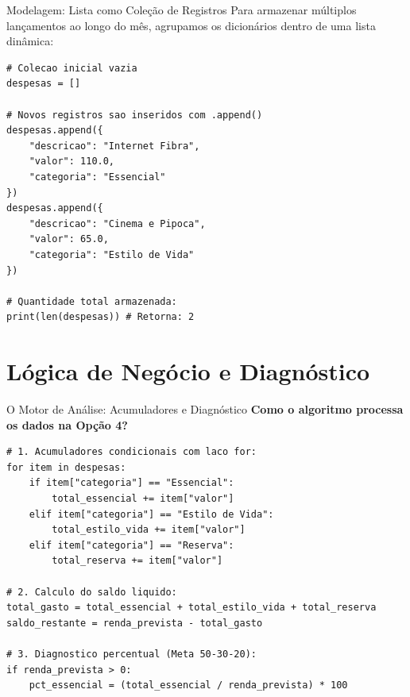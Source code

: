 \documentclass[10pt]{beamer}
\begin{document}
\begin{frame}[fragile]{Modelagem: Lista como Coleção de Registros}
    Para armazenar múltiplos lançamentos ao longo do mês, agrupamos os dicionários dentro de uma lista dinâmica:

    \vspace{0.2cm}
    \begin{lstlisting}
# Colecao inicial vazia
despesas = []

# Novos registros sao inseridos com .append()
despesas.append({
    "descricao": "Internet Fibra",
    "valor": 110.0,
    "categoria": "Essencial"
})
despesas.append({
    "descricao": "Cinema e Pipoca",
    "valor": 65.0,
    "categoria": "Estilo de Vida"
})

# Quantidade total armazenada:
print(len(despesas)) # Retorna: 2
    \end{lstlisting}
\end{frame}

\section{Lógica de Negócio e Diagnóstico}

\begin{frame}[fragile]{O Motor de Análise: Acumuladores e Diagnóstico}
    \textbf{Como o algoritmo processa os dados na Opção 4?}

    \vspace{0.2cm}
    \begin{lstlisting}
# 1. Acumuladores condicionais com laco for:
for item in despesas:
    if item["categoria"] == "Essencial":
        total_essencial += item["valor"]
    elif item["categoria"] == "Estilo de Vida":
        total_estilo_vida += item["valor"]
    elif item["categoria"] == "Reserva":
        total_reserva += item["valor"]

# 2. Calculo do saldo liquido:
total_gasto = total_essencial + total_estilo_vida + total_reserva
saldo_restante = renda_prevista - total_gasto

# 3. Diagnostico percentual (Meta 50-30-20):
if renda_prevista > 0:
    pct_essencial = (total_essencial / renda_prevista) * 100
    \end{lstlisting}
\end{frame}
\end{document}
